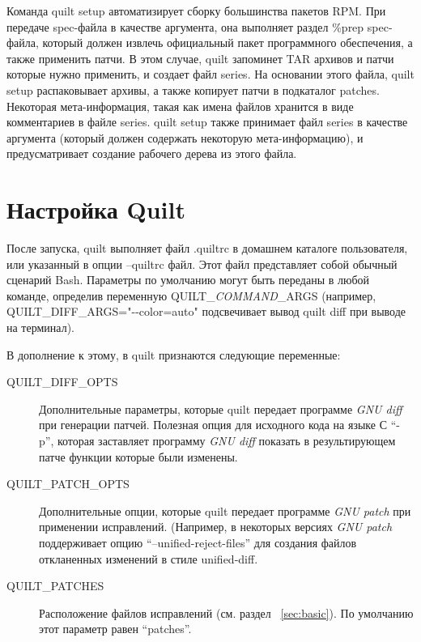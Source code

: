 \documentclass{article}
\newcommand{\quilt}[1]{\textsf{quilt #1}}
\newcommand{\prog}[1]{\textit{#1}}
\begin{document}
Команда \quilt{setup} автоматизирует сборку большинства пакетов RPM. При передаче spec-файла в качестве аргумента, она выполняет раздел \textsf{\%prep} spec-файла, который должен извлечь официальный пакет программного обеспечения, а также применить патчи. В этом случае, quilt запоминет TAR архивов и патчи которые нужно применить, и создает файл \textsf{series}. На основании этого файла, \quilt{setup} распаковывает архивы, а также копирует патчи в подкаталог \textsf{patches}. Некоторая мета-информация, такая как имена файлов хранится в виде комментариев в файле \textsf{series}. \quilt{setup} также принимает файл \textsf{series} в качестве аргумента (который должен содержать некоторую мета-информацию), и предусматривает создание рабочего дерева из этого файла.

\section{Настройка Quilt}

После запуска, quilt выполняет файл \textsf{.quiltrc} в домашнем каталоге пользователя, или указанный в опции \textsf{--quiltrc} файл. Этот файл представляет собой обычный сценарий Bash. Параметры по умолчанию могут быть переданы в любой команде, определив переменную \textsf{QUILT\_\textit{COMMAND}\_ARGS} (например,  \textsf{QUILT\_DIFF\_ARGS="-{}-color=auto"} подсвечивает вывод \quilt{diff} при выводе на терминал).

В дополнение к этому, в quilt признаются следующие переменные:

\begin{description}

\item[\textsf{QUILT\_DIFF\_OPTS}]
Дополнительные параметры, которые quilt передает программе \prog{GNU diff} при генерации патчей. Полезная опция для исходного кода на языке С ``\textsf{-p}'', которая заставляет программу \prog{GNU diff} показать в результирующем патче функции которые были изменены.

\item[\textsf{QUILT\_PATCH\_OPTS}]
Дополнительные опции, которые quilt передает программе   \prog{GNU patch} при применении исправлений. (Например, в некоторых версиях \prog{GNU patch} поддерживает опцию ``\textsf{--unified-reject-files}'' для создания файлов откланенных изменений в стиле unified-diff.

\item[\textsf{QUILT\_PATCHES}]
Расположение файлов исправлений (см. раздел ~\ref{sec:basic}). По умолчанию этот параметр равен ``\textsf{patches}''.

\end{description}
\end{document}
